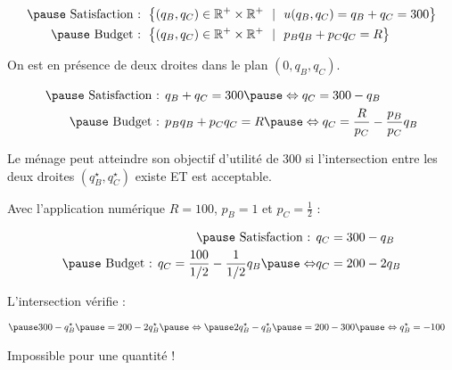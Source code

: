 \documentclass[9pt,professionalfonts,handout,hyperref]{beamer}
\begin{document}
\begin{frame}

\[\begin{aligned}
\pause \text{ Satisfaction :   }&\left\{(q_B, q_C) \in \mathbb{R}^{+}\times\mathbb{R}^{+} ~~|~~u(q_B, q_C) = q_B + q_C = 300 \right\} \\
\pause \text{ Budget :   }&\left\{(q_B, q_C) \in \mathbb{R}^{+}\times\mathbb{R}^{+} ~~|~~p_Bq_B + p_Cq_C=R\right\}
\end{aligned}\]

\bigskip 

\pause On est en présence de deux droites dans le plan $(0,q_B,q_C)$. 

\[\begin{aligned}
\pause \text{ Satisfaction :   }&q_B + q_C = 300 \pause \Leftrightarrow q_C = 300-q_B \\
\pause \text{ Budget :   }&p_Bq_B + p_Cq_C=R \pause \Leftrightarrow q_C = \frac{R}{p_C} -\frac{p_B}{p_C}q_B
\end{aligned}\]

\pause Le ménage peut atteindre son objectif d'utilité de 300 \pause si l'intersection entre les deux droites $(q_B^\star,q_C^\star)$ existe \pause ET est acceptable. 

\end{frame}


\begin{frame}


Avec l'application numérique $R =100$, $p_B= 1$ et $p_C = \frac{1}{2}$ : 

\[\begin{aligned}
\pause \text{ Satisfaction :   }&q_C = 300-q_B \\
\pause \text{ Budget :   }q_C = \frac{100}{1/2} -\frac{1}{1/2}q_B\pause \Leftrightarrow &q_C = 200-2q_B
\end{aligned}\]

\pause L'intersection vérifie : 

\[\begin{aligned}
\pause &300-q_B^\star \pause = 200-2q_B^\star \pause \Leftrightarrow \pause 2q_B^\star-q_B^\star \pause = 200-300 \pause \Leftrightarrow q_B^\star = -100
\end{aligned}\]

\bigskip 

\pause Impossible pour une quantité !

\end{frame}
\end{document}
